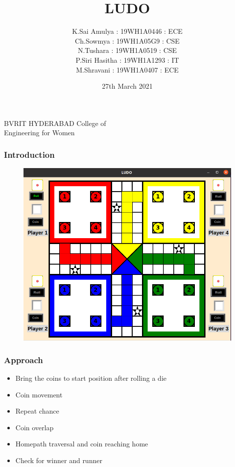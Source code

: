 \documentclass[15pt]{beamer}
\title{LUDO}
\date{27th March 2021}
\author[Bvrith]{K.Sai Amulya : 19WH1A0446 : ECE \\ Ch.Sowmya : 19WH1A05G9 : CSE \\ N.Tushara : 19WH1A0519 : CSE \\ P.Siri Hasitha : 19WH1A1293 : IT \\ M.Shravani : 19WH1A0407 : ECE}
\begin{document}
    \begin{frame}
        \titlepage
	    \begin{center}
	 BVRIT HYDERABAD College of \\ Engineering for Women
	    \end{center}
    \end{frame}

    \begin{frame}
    \frametitle{Introduction}
        \begin{figure}

		\begin{center}
		\includegraphics[width=0.9\linewidth]{board_1.png}
		\end{center}
        \end{figure} 
    
    \end{frame}

  
    \begin{frame}
	    \frametitle{Approach}
	    \begin{itemize}
		    \item Bring the coins to start position after rolling a die
	            \item Coin movement
	            \item Repeat chance
		    \item Coin overlap
		    \item Homepath traversal and coin reaching home
		    \item Check for winner and runner
	    \end{itemize}
    \end{frame}
\end{document}
